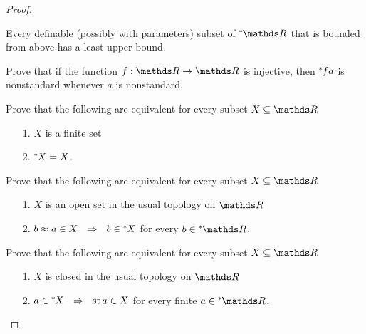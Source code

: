 \begin{proof}

\begin{exercise}\label{ex_dedekindcomplete}
  Every definable (possibly with parameters) subset of $\nsR$ that is bounded from above has a least upper bound.
\end{exercise}

\begin{exercise}
Prove that if the function $f:\RR\to\RR$ is injective, then ${}^*\kern-.2ex f a$ is nonstandard whenever $a$ is nonstandard.
\end{exercise}

\begin{exercise}
Prove that the following are equivalent for every subset $X\subseteq\RR$\nobreak
\begin{itemize}
\item[1.]  $X$ is a finite set
\item[2.]  ${}^*\kern-.2ex X=X$.
\end{itemize}
\end{exercise}

\begin{exercise}\label{ex_open_nstd}
Prove that the following are equivalent for every subset $X\subseteq\RR$\nobreak
\begin{itemize}
\item[1.]  $X$ is an open set in the usual topology on $\RR$
\item[2.]  $b\approx a\in X \ \ \Rightarrow\ \ b\in{}^*\kern-.2ex X$ for every $b\in\nsR$.
\end{itemize}
\end{exercise}

\begin{exercise}\label{ex_closed_nstd}
Prove that the following are equivalent for every subset $X\subseteq\RR$\nobreak
\begin{itemize}
\item[1.]  $X$ is closed in the usual topology on $\RR$
\item[2.]  $a\in{}^*\kern-.2ex X \ \ \Rightarrow\ \ {\rm st}\, a\in X$ for every finite $a\in\nsR$.
\end{itemize}
\end{exercise}



\end{proof}
